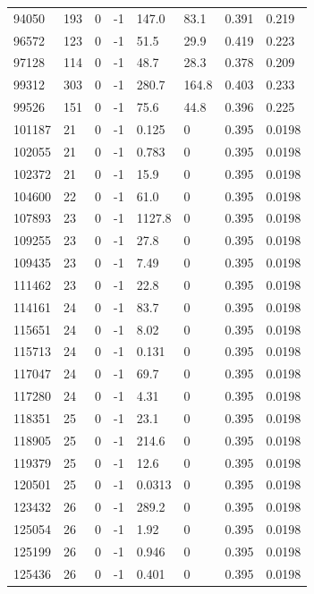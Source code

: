 \documentclass[preview]{standalone}
\begin{document}
{{{\begin{tabular}{L{1.2cm}C{1.2cm} C{0.3cm}C{0.5cm} C{1.4cm}C{1.4cm} C{1.4cm}C{1.4cm}}
  94050  &   193  & 0     & -1 &  147.0  & 83.1  & 0.391 &  0.219   \\ 
  96572  &   123  & 0     & -1 &  51.5  & 29.9  & 0.419 &  0.223   \\ 
  97128  &   114  & 0     & -1 &  48.7  & 28.3  & 0.378 &  0.209   \\ 
  99312  &   303  & 0     & -1 &  280.7  & 164.8  & 0.403 &  0.233   \\ 
  99526  &   151  & 0     & -1 &  75.6  & 44.8  & 0.396 &  0.225   \\ 
  101187  &    21  & 0     & -1 &  0.125  & 0  & 0.395 &  0.0198   \\ 
  102055  &    21  & 0     & -1 &  0.783  & 0  & 0.395 &  0.0198   \\ 
  102372  &    21  & 0     & -1 &  15.9  & 0  & 0.395 &  0.0198   \\ 
  104600  &    22  & 0     & -1 &  61.0  & 0  & 0.395 &  0.0198   \\ 
  107893  &    23  & 0     & -1 &  1127.8  & 0  & 0.395 &  0.0198   \\ 
  109255  &    23  & 0     & -1 &  27.8  & 0  & 0.395 &  0.0198   \\ 
  109435  &    23  & 0     & -1 &  7.49  & 0  & 0.395 &  0.0198   \\ 
  111462  &    23  & 0     & -1 &  22.8  & 0  & 0.395 &  0.0198   \\ 
  114161  &    24  & 0     & -1 &  83.7  & 0  & 0.395 &  0.0198   \\ 
  115651  &    24  & 0     & -1 &  8.02  & 0  & 0.395 &  0.0198   \\ 
  115713  &    24  & 0     & -1 &  0.131  & 0  & 0.395 &  0.0198   \\ 
  117047  &    24  & 0     & -1 &  69.7  & 0  & 0.395 &  0.0198   \\ 
  117280  &    24  & 0     & -1 &  4.31  & 0  & 0.395 &  0.0198   \\ 
  118351  &    25  & 0     & -1 &  23.1  & 0  & 0.395 &  0.0198   \\ 
  118905  &    25  & 0     & -1 &  214.6  & 0  & 0.395 &  0.0198   \\ 
  119379  &    25  & 0     & -1 &  12.6  & 0  & 0.395 &  0.0198   \\ 
  120501  &    25  & 0     & -1 &  0.0313  & 0  & 0.395 &  0.0198   \\ 
  123432  &    26  & 0     & -1 &  289.2  & 0  & 0.395 &  0.0198   \\ 
  125054  &    26  & 0     & -1 &  1.92  & 0  & 0.395 &  0.0198   \\ 
  125199  &    26  & 0     & -1 &  0.946  & 0  & 0.395 &  0.0198   \\ 
  125436  &    26  & 0     & -1 &  0.401  & 0  & 0.395 &  0.0198   \\ 
\hline 
\end{tabular} 

}}}
\end{document}
